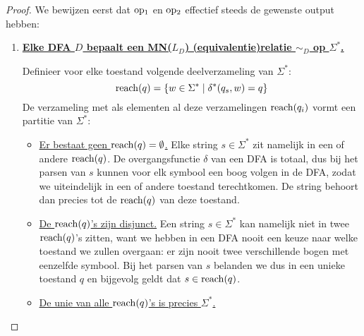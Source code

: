 \documentclass[../aanvullingen_cursus.tex]{subfiles}
\begin{document}
\begin{proof}
	We bewijzen eerst dat \(\operatorname{op_1}\) en \(\operatorname{op_2}\) effectief steeds de gewenste output hebben:
	\begin{enumerate}
		\item \underline{\textbf{Elke DFA \(D\) bepaalt een MN(\(L_D\)) (equivalentie)relatie \(\sim_D\)  op \(\Sigma^*\).}}

		Definieer voor elke toestand volgende deelverzameling van \(\Sigma^*\): \[\operatorname{reach}(q) = \{w \in \Sigma^* \mid \delta^*(q_s,w)=q\}\] De verzameling met als elementen al deze verzamelingen \(\operatorname{reach}(q_i)\) vormt een partitie van \(\Sigma^*\):
		\begin{itemize}
			\item \underline{Er bestaat geen \(\operatorname{reach}(q)=\emptyset\).} Elke string \(s \in \Sigma^*\) zit namelijk in een of andere \(\operatorname{reach}(q)\). De overgangsfunctie \(\delta\) van een DFA is totaal, dus bij het parsen van \(s\) kunnen voor elk symbool een boog volgen in de DFA, zodat we uiteindelijk in een of andere toestand terechtkomen. De string behoort dan precies tot de \(\operatorname{reach}(q)\) van deze toestand.
			\item \underline{De \(\operatorname{reach}(q)\)'s zijn disjunct.} Een string \(s \in \Sigma^*\) kan namelijk niet in twee \(\operatorname{reach}(q)\)'s zitten, want we hebben in een DFA nooit een keuze naar welke toestand we zullen overgaan: er zijn nooit twee verschillende bogen met eenzelfde symbool. Bij het parsen van \(s\) belanden we dus in een unieke toestand \(q\) en bijgevolg geldt dat \(s \in \operatorname{reach}(q)\).
			\item \underline{De unie van alle \(\operatorname{reach}(q)\)'s is precies \(\Sigma^*\).}
		\end{itemize}


\end{enumerate}
\end{proof}
\end{document}

